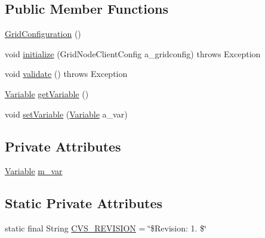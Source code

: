 \subsection*{Public Member Functions}
\begin{DoxyCompactItemize}
\item 
\hyperlink{classexamples_1_1grid_1_1math_problem_distributed_1_1_grid_configuration_afddeb3984b351bc8421fd9a54ccda68c}{Grid\-Configuration} ()
\item 
void \hyperlink{classexamples_1_1grid_1_1math_problem_distributed_1_1_grid_configuration_aec373cb923a1f7fd470a5c0920fe9ce9}{initialize} (Grid\-Node\-Client\-Config a\-\_\-gridconfig)  throws Exception 
\item 
void \hyperlink{classexamples_1_1grid_1_1math_problem_distributed_1_1_grid_configuration_ada2daa3a763832977d0e0a2a36b7b5a8}{validate} ()  throws Exception 
\item 
\hyperlink{classorg_1_1jgap_1_1gp_1_1terminal_1_1_variable}{Variable} \hyperlink{classexamples_1_1grid_1_1math_problem_distributed_1_1_grid_configuration_a500a7cfca41775f22033ebc1288dc547}{get\-Variable} ()
\item 
void \hyperlink{classexamples_1_1grid_1_1math_problem_distributed_1_1_grid_configuration_a3c234e3a2f50e6235fc7d92c05264ceb}{set\-Variable} (\hyperlink{classorg_1_1jgap_1_1gp_1_1terminal_1_1_variable}{Variable} a\-\_\-var)
\end{DoxyCompactItemize}
\subsection*{Private Attributes}
\begin{DoxyCompactItemize}
\item 
\hyperlink{classorg_1_1jgap_1_1gp_1_1terminal_1_1_variable}{Variable} \hyperlink{classexamples_1_1grid_1_1math_problem_distributed_1_1_grid_configuration_a39c3e288aea96cc4e7cc2747e8e4ab7f}{m\-\_\-var}
\end{DoxyCompactItemize}
\subsection*{Static Private Attributes}
\begin{DoxyCompactItemize}
\item 
static final String \hyperlink{classexamples_1_1grid_1_1math_problem_distributed_1_1_grid_configuration_a16a71751c47a8f936c2fa5ed34bd39fe}{C\-V\-S\-\_\-\-R\-E\-V\-I\-S\-I\-O\-N} = \char`\"{}\$Revision\-: 1. \$\char`\"{}
\end{DoxyCompactItemize}


